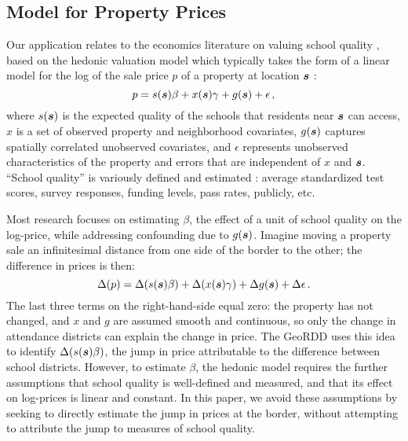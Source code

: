 \subsection{Model for Property Prices}

Our application relates to the economics literature on valuing school quality \citep{black2011housing}, 
based on the hedonic valuation model \citep{rosen1974hedonic,sheppard1999hedonic} which typically takes the form of a linear model for the log of the sale price \(p\) of a property at location \(\bm{s}\) \citep[see for example][]{gibbons2013valuing}:
\begin{equation}
    p = s(\bm{s})\beta + x(\bm{s})\gamma + g(\bm{s}) + \epsilon
    \,,
    \label{eq:hedonic}
\end{equation}
where \(s(\bm{s})\) is the expected quality of the schools that residents near \(\bm{s}\) can access,
\(x\) is a set of observed property and neighborhood covariates, \(g(\bm{s})\) captures spatially correlated unobserved covariates, and \(\epsilon\) represents unobserved characteristics of the property and errors that are independent of \(x\) and \(\bm{s}\).
``School quality'' is variously defined and estimated \citep{black2011housing}: average standardized test scores, survey responses, funding levels, pass rates, publicly, etc.

Most research focuses on estimating \(\beta\), the effect of a unit of school quality on the log-price, while addressing confounding due to \(g(\bm{s})\).
Imagine moving a property sale an infinitesimal distance from one side of the border to the other; 
the difference in prices is then:
\begin{equation}
    \Delta(p) = \Delta(s(\bm{s}) \beta) + \Delta(x(\bm{s})\gamma)+ \Delta{g(\bm{s})} + \Delta{\epsilon}
    \,.
    \label{eq:hedonic_diff}
\end{equation}
The last three terms on the right-hand-side equal zero: the property has not changed, and \(x\) and \(g\) are assumed smooth and continuous, so only the change in attendance districts can explain the change in price.
The GeoRDD uses this idea to identify \(\Delta(s(\bm{s}) \beta)\), the jump in price attributable to the difference between school districts.
However, to estimate \(\beta\), the hedonic model requires the further assumptions that school quality is well-defined and measured, and that its effect on log-prices is linear and constant.
In this paper, we avoid these assumptions by seeking to directly estimate the jump in prices at the border, without attempting to attribute the jump to measures of school quality.

